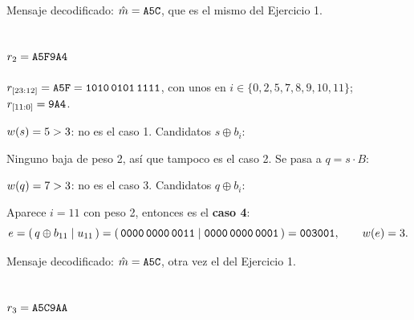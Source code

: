\documentclass[11pt,a4paper]{article}
\begin{document}
\begin{center}\small
\rARes
\end{center}

Mensaje decodificado: $\hat{m} = \texttt{A5C}$, que es el mismo del
Ejercicio 1.

\subsection{$r_2 = \texttt{A5F9A4}$}

$r_{[23:12]} = \texttt{A5F} = \texttt{1010\,0101\,1111}$, con unos en
$i\in\{0,2,5,7,8,9,10,11\}$; $r_{[11:0]} = \texttt{9A4}$.

\begin{center}\small
\begin{minipage}[b]{0.46\textwidth}\centering
  \rBXor
\end{minipage}\hfill
\begin{minipage}[b]{0.50\textwidth}\centering
  \rBSind
\end{minipage}
\end{center}

$w(s) = 5 > 3$: no es el caso 1. Candidatos $s \oplus b_i$:

\begin{center}\small
\rBTablaDos
\end{center}

Ninguno baja de peso 2, así que tampoco es el caso 2. Se pasa a
$q = s\cdot B$:

\begin{center}\small
\rBQ
\end{center}

$w(q) = 7 > 3$: no es el caso 3. Candidatos $q \oplus b_i$:

\begin{center}\small
\rBTablaCuatro
\end{center}

Aparece $i=11$ con peso 2, entonces es el \textbf{caso 4}:
\[
  e = (\,q\oplus b_{11} \mid u_{11}\,)
    = (\,\texttt{0000\,0000\,0011} \mid \texttt{0000\,0000\,0001}\,)
    = \texttt{003001}, \qquad w(e)=3 .
\]

\begin{center}\small
\rBRes
\end{center}

Mensaje decodificado: $\hat{m} = \texttt{A5C}$, otra vez el del Ejercicio 1.

\subsection{$r_3 = \texttt{A5C9AA}$}
\end{document}

